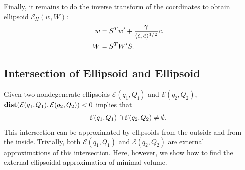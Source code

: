 \documentclass[letterpaper,10pt,english]{sphinxmanual}
\begin{document}
Finally, it remains to do the inverse transform of the coordinates to
obtain ellipsoid \({\mathcal E}_H(w,W)\):
\begin{gather}
\begin{split}\begin{aligned}
w & = S^Tw' + \frac{\gamma}{\langle c,c\rangle^{1/2}}c, \\
W & = S^TW'S.\end{aligned}\end{split}\notag
\end{gather}

\subsection{Intersection of Ellipsoid and Ellipsoid}
\label{chap_ellcalc:intersection-of-ellipsoid-and-ellipsoid}
Given two nondegenerate ellipsoids \({\mathcal E}(q_1,Q_1)\) and
\({\mathcal E}(q_2,Q_2)\),
\({\bf dist}({\mathcal E}(q_1,Q_1),{\mathcal E}(q_2,Q_2))<0\)
implies that
\begin{gather}
\begin{split}{\mathcal E}(q_1,Q_1)\cap{\mathcal E}(q_2,Q_2)\neq\emptyset .\end{split}\notag
\end{gather}
This intersection can be approximated by ellipsoids from the outside
and from the inside. Trivially, both \({\mathcal E}(q_1,Q_1)\) and
\({\mathcal E}(q_2,Q_2)\) are external approximations of this
intersection. Here, however, we show how to find the external
ellipsoidal approximation of minimal volume.
\end{document}
